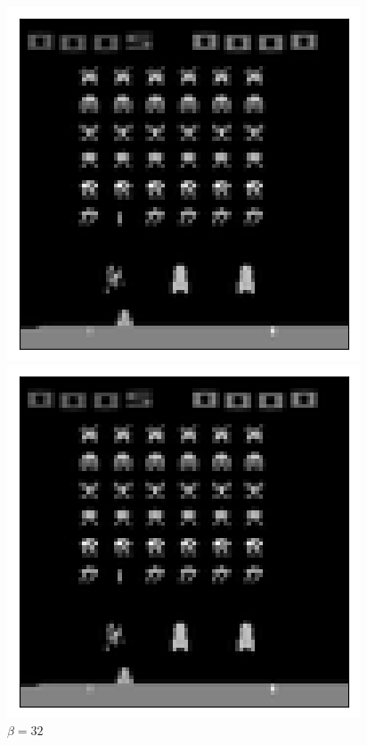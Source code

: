 \begin{figure}[h!]
\begin{multicols}{4}
    \includegraphics[scale=0.4]{figures/results/indiscriminate_decoupling/beta_4_sample_0_reconstructed.png}
    \caption{$\beta = 4$}
    \includegraphics[scale=0.4]{figures/results/indiscriminate_decoupling/beta_32_sample_0_reconstructed.png}
    \caption{$\beta = 32$}
\end{multicols}
\begin{multicols}{4}

\end{multicols}
\end{figure}
